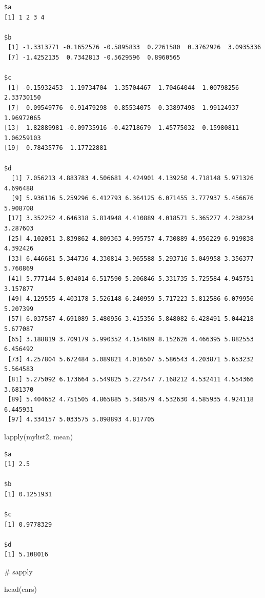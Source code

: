 \documentclass[
  letterpaper,
  DIV=11,
  numbers=noendperiod]{scrreprt}
\newenvironment{Shaded}{\begin{snugshade}}{\end{snugshade}}
\newcommand{\CommentTok}[1]{\textcolor[rgb]{0.37,0.37,0.37}{#1}}
\newcommand{\FunctionTok}[1]{\textcolor[rgb]{0.28,0.35,0.67}{#1}}
\newcommand{\NormalTok}[1]{\textcolor[rgb]{0.00,0.23,0.31}{#1}}
\begin{document}
\begin{verbatim}
$a
[1] 1 2 3 4

$b
 [1] -1.3313771 -0.1652576 -0.5895833  0.2261580  0.3762926  3.0935336
 [7] -1.4252135  0.7342813 -0.5629596  0.8960565

$c
 [1] -0.15932453  1.19734704  1.35704467  1.70464044  1.00798256  2.33730150
 [7]  0.09549776  0.91479298  0.85534075  0.33897498  1.99124937  1.96972065
[13]  1.82889981 -0.09735916 -0.42718679  1.45775032  0.15980811  1.06259103
[19]  0.78435776  1.17722881

$d
  [1] 7.056213 4.883783 4.506681 4.424901 4.139250 4.718148 5.971326 4.696488
  [9] 5.936116 5.259296 6.412793 6.364125 6.071455 3.777937 5.456676 5.908708
 [17] 3.352252 4.646318 5.814948 4.410889 4.018571 5.365277 4.238234 3.287603
 [25] 4.102051 3.839862 4.809363 4.995757 4.730889 4.956229 6.919838 4.392426
 [33] 6.446681 5.344736 4.330814 3.965588 5.293716 5.049958 3.356377 5.760869
 [41] 5.777144 5.034014 6.517590 5.206846 5.331735 5.725584 4.945751 3.157877
 [49] 4.129555 4.403178 5.526148 6.240959 5.717223 5.812586 6.079956 5.207399
 [57] 6.037587 4.691089 5.480956 3.415356 5.848082 6.428491 5.044218 5.677087
 [65] 3.188819 3.709179 5.990352 4.154689 8.152626 4.466395 5.882553 6.456492
 [73] 4.257804 5.672484 5.089821 4.016507 5.586543 4.203871 5.653232 5.564583
 [81] 5.275092 6.173664 5.549825 5.227547 7.168212 4.532411 4.554366 3.681370
 [89] 5.404652 4.751505 4.865885 5.348579 4.532630 4.585935 4.924118 6.445931
 [97] 4.334157 5.033575 5.098893 4.817705
\end{verbatim}

\begin{Shaded}
\begin{Highlighting}[]
\FunctionTok{lapply}\NormalTok{(mylist2, mean)}
\end{Highlighting}
\end{Shaded}

\begin{verbatim}
$a
[1] 2.5

$b
[1] 0.1251931

$c
[1] 0.9778329

$d
[1] 5.108016
\end{verbatim}

\begin{Shaded}
\begin{Highlighting}[]
\CommentTok{\# sapply}

\FunctionTok{head}\NormalTok{(cars)}
\end{Highlighting}
\end{Shaded}
\end{document}
